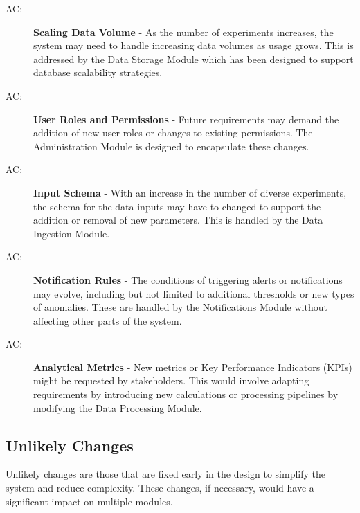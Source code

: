 \documentclass[12pt, titlepage]{article}
\newcounter{acnum}
\newcommand{\actheacnum}{AC\theacnum}
\begin{document}
\begin{description}
  \item[ \actheacnum \label{acScaling}:] \textbf{Scaling Data Volume} - 
  As the number of experiments increases, the system may need to handle increasing data volumes
  as usage grows. This is addressed by the Data Storage Module which has been designed to support
  database scalability strategies.

  \item[ \actheacnum \label{acRoles}:] \textbf{User Roles and Permissions} - 
  Future requirements may demand the addition of new user roles or changes to existing permissions.
  The Administration Module is designed to encapsulate these changes.

  \item[ \actheacnum \label{acSchema}:] \textbf{Input Schema} - 
  With an increase in the number of diverse experiments, the schema for the data inputs may have to
  changed to support the addition or removal of new parameters. This is handled by the Data Ingestion
  Module.

  \item[ \actheacnum \label{acNotifs}:] \textbf{Notification Rules} - 
  The conditions of triggering alerts or notifications may evolve, including but not limited to
  additional thresholds or new types of anomalies. These are handled by the Notifications Module
  without affecting other parts of the system.
  
  \item[ \actheacnum \label{acMetrics}:] \textbf{Analytical Metrics} - 
  New metrics or Key Performance Indicators (KPIs) might be requested by stakeholders. This would
  involve adapting requirements by introducing new calculations or processing pipelines by modifying
  the Data Processing Module.
  
\end{description}

\subsection{Unlikely Changes} \label{SecUchange}

Unlikely changes are those that are fixed early in the design to simplify the system
and reduce complexity. These changes, if necessary, would have a significant impact on
multiple modules.
\end{document}
